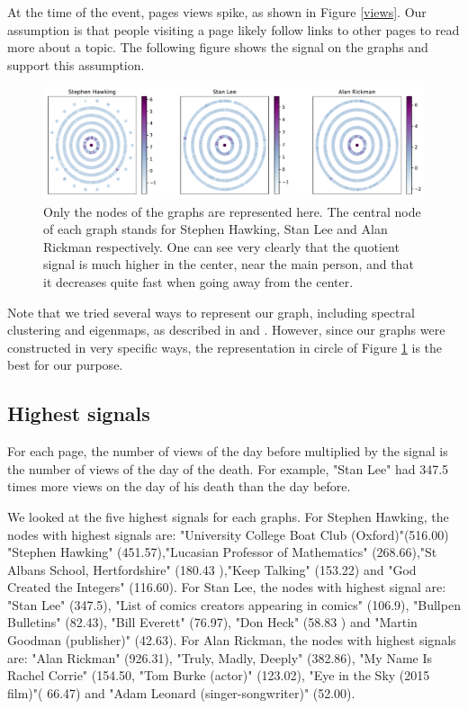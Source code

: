 \documentclass[conference]{IEEEtran}
\begin{document}
\medskip
At the time of the event, pages views spike, as shown in Figure \ref{views}. Our assumption is that people visiting a page likely follow links to other pages to read more about a topic. The following figure shows the signal on the graphs and support this assumption. 

\begin{figure}[!htb] \label{circle}
  \includegraphics[width=\linewidth]{signal_scatter.pdf}
\caption{Only the nodes of the graphs are represented here. The central node of each graph stands for Stephen Hawking, Stan Lee and Alan Rickman respectively. One can see very clearly that the quotient signal is much higher in the center, near the main person, and that it decreases quite fast when going away from the center.}
\end{figure}

Note that we tried several ways to represent our graph, including spectral clustering and eigenmaps, as described in \cite{clustering} and \cite{laplacian}. However, since our graphs were constructed in very specific ways, the representation in circle of Figure \ref{circle} is the best for our purpose. 

\subsection{Highest signals}
 For each page, the number of views of the day before multiplied by the signal is the number of views of the day of the death. For example, "Stan Lee" had 347.5 times more views on the day of his death than the day before. 
 
 \medskip
 
We looked at the five highest signals for each graphs. For Stephen Hawking, the nodes with highest signals are: "University College Boat Club (Oxford)"(516.00)
"Stephen Hawking" (451.57),"Lucasian Professor of Mathematics" (268.66),"St Albans School, Hertfordshire" (180.43 ),"Keep Talking" (153.22) and "God Created the Integers" (116.60).
\newline
For Stan Lee, the nodes with highest signal are:  "Stan Lee" (347.5), "List of comics creators appearing in comics" (106.9), "Bullpen Bulletins" (82.43), "Bill Everett" (76.97), "Don Heck" (58.83 ) and "Martin Goodman (publisher)" (42.63). 
\newline
For Alan Rickman, the nodes with highest signals are: "Alan Rickman" (926.31), "Truly, Madly, Deeply" (382.86), "My Name Is Rachel Corrie" (154.50, "Tom Burke (actor)" (123.02), "Eye in the Sky (2015 film)"( 66.47) and "Adam Leonard (singer-songwriter)" (52.00). 
\end{document}
